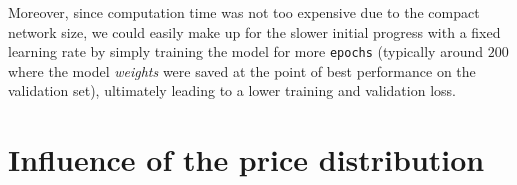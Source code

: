 \documentclass[12pt, letterpaper]{article}
\begin{document}
Moreover, since computation time was not too expensive due to the compact network size, we could easily make up for the slower initial progress with a fixed learning rate by simply training the model for more \texttt{epochs} (typically around $200$ where the model \emph{weights} were saved at the point of best performance on the validation set), ultimately leading to a lower training and validation loss.



\section{Influence of the price distribution}



\newpage



\end{document}
